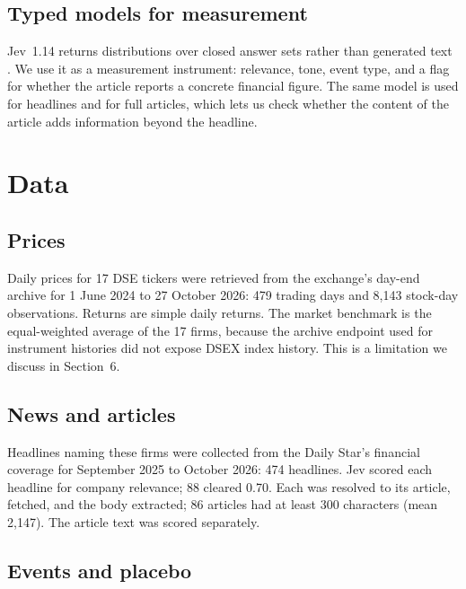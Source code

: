\documentclass[10pt,twocolumn,a4paper]{article}
\begin{document}
\subsection{Typed models for measurement}

Jev~1.14 returns distributions over closed answer sets rather than generated text
\citep{typesafe2026models}. We use it as a measurement instrument: relevance, tone, event type, and a
flag for whether the article reports a concrete financial figure. The same model is used for headlines
and for full articles, which lets us check whether the content of the article adds information beyond
the headline.

\section{Data}

\subsection{Prices}

Daily prices for 17 DSE tickers were retrieved from the exchange's day-end archive
\citep{dse2026dayend} for 1 June 2024 to 27 October 2026: 479 trading days and 8,143 stock-day
observations. Returns are simple daily returns. The market benchmark is the equal-weighted average of
the 17 firms, because the archive endpoint used for instrument histories did not expose DSEX index
history. This is a limitation we discuss in Section~6.

\subsection{News and articles}

Headlines naming these firms were collected from the Daily Star's financial coverage
\citep{dailystar2026} for September 2025 to October 2026: 474 headlines. Jev scored each headline for
company relevance; 88 cleared 0.70. Each was resolved to its article, fetched, and the body extracted;
86 articles had at least 300 characters (mean 2,147). The article text was scored separately.

\subsection{Events and placebo}
\end{document}
